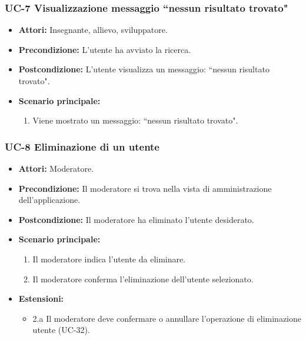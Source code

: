 \subsubsection{UC-7 Visualizzazione messaggio ``nessun risultato trovato"}
\begin{itemize}
		\item \textbf{Attori:} Insegnante, allievo, sviluppatore.
		
		\item \textbf{Precondizione:} L'utente ha avviato la ricerca. 
		\item \textbf{Postcondizione:} L'utente visualizza un messaggio: ``nessun risultato trovato".
		\item \textbf{Scenario principale: }
		\begin{enumerate}
			\item Viene mostrato un messaggio: ``nessun risultato trovato".
		\end{enumerate}
\end{itemize}

\subsubsection{UC-8 Eliminazione di un utente}
\begin{itemize}
	\item \textbf{Attori:} Moderatore.
	\item \textbf{Precondizione:} Il moderatore si trova nella vista di amministrazione dell'applicazione.
	\item \textbf{Postcondizione:} Il moderatore ha eliminato l'utente desiderato.
	\item \textbf{Scenario principale:}
	\begin{enumerate}
		\item Il moderatore indica l'utente da eliminare.
		\item Il moderatore conferma l'eliminazione dell'utente selezionato.
	\end{enumerate}
\item \textbf{Estensioni:}
\begin{itemize}
	\item 2.a Il moderatore deve confermare o annullare l'operazione di eliminazione utente (UC-32).
\end{itemize}
\end{itemize}

	
